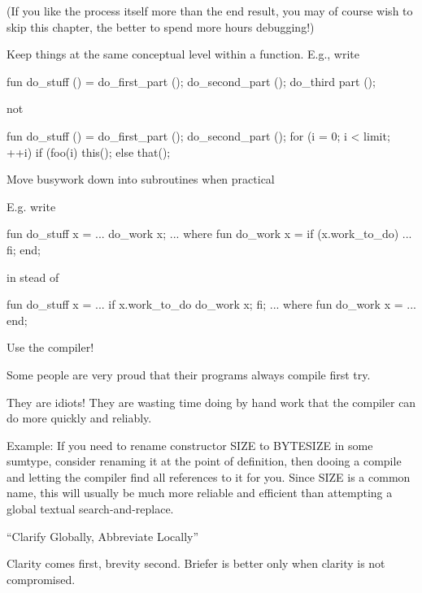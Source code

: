 (If you like the process itself more than the end result, you may of 
course wish to skip this chapter, the better to spend more hours debugging!)




Keep things at the same conceptual level within a function.
E.g., write

    fun do_stuff ()
        = 
        {    do_first_part  ();
             do_second_part ();
             do_third part  ();
        }

not

    fun do_stuff ()
        = 
        {    do_first_part  ();
             do_second_part ();
             for (i = 0; i < limit; ++i) { 
                 if (foo(i)   this(); 
                 else         that(); 
             } 
        } 



Move busywork down into subroutines when practical 

E.g. write 

     fun do_stuff x 
         = 
         { 
             ... 
             do_work x; 
             ... 
         } 
         where 
             fun do_work x 
                 = 
                 if (x.work_to_do) 
                     ... 
                 fi; 
         end; 

in stead of 

     fun do_stuff x 
         = 
         { 
             ... 
             if x.work_to_do   do_work x;       fi; 
             ... 
         }  
         where 
             fun do_work x 
                 = 
                 ... 
         end; 

          


Use the compiler!

Some people are very proud that their programs always compile first try.

They are idiots!  They are wasting time doing by hand work that the 
compiler can do more quickly and reliably. 

Example: If you need to rename constructor SIZE to BYTESIZE in 
some sumtype, consider renaming it at the point of definition, then 
dooing a compile and letting the compiler find all references to it 
for you.  Since SIZE is a common name, this will usually be much more 
reliable and efficient than attempting a global textual 
search-and-replace.


``Clarify Globally, Abbreviate Locally''

Clarity comes first, brevity second.  Briefer is better only when clarity is not compromised.





